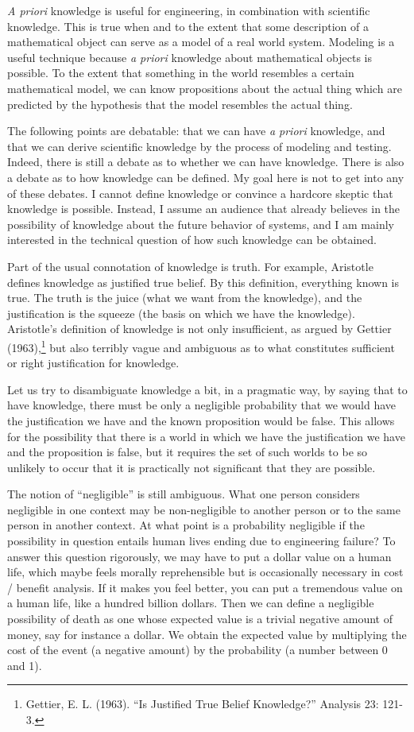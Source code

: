 \documentclass[11pt]{article}
\begin{document}
\emph{A priori}\/ knowledge is useful for engineering, in combination with scientific
knowledge. This is true when and to the extent that some description of a mathematical object
can serve as a model of a real world system. Modeling is a useful technique because
\emph{a priori}\/ knowledge about mathematical objects is possible. To the extent
that something in the world resembles a certain mathematical model, we can know propositions
about the actual thing which are predicted by the hypothesis that the model resembles
the actual thing.

The following points are debatable: that we can have
\emph{a priori}\/ knowledge, and that we can derive scientific knowledge by the process
of modeling and testing. Indeed, there is still a debate as to whether we can have knowledge.
There is also a debate as to how knowledge can be defined. My goal here is not to get
into any of these debates. I cannot define knowledge or convince a hardcore skeptic
that knowledge is possible. Instead, I assume an audience that already believes in the
possibility of knowledge about the future behavior of systems, and I am mainly interested in
the technical question of how such knowledge can be obtained.

Part of the usual connotation of knowledge is truth. For example, Aristotle defines knowledge
as justified true belief. By this definition, everything known is true. The truth is the
juice (what we want from the knowledge), and the justification is the squeeze (the basis
on which we have the knowledge). Aristotle's definition of knowledge is not only
insufficient, as argued by Gettier (1963),\footnote{Gettier, E. L. (1963).
``Is Justified True Belief Knowledge?'' Analysis 23: 121-3.}
but also terribly vague and ambiguous as to what constitutes sufficient or
right justification for knowledge.

Let us try to disambiguate knowledge a bit, in a pragmatic way, by saying that to
have knowledge, there must be only a negligible probability that we would have the
justification we have and the known proposition would be false. This allows for the
possibility that there is a world in which we have the justification we have and the
proposition is false, but it requires the set of such worlds to be so unlikely to occur
that it is practically not significant that they are possible.

The notion of ``negligible'' is still ambiguous. What one person considers negligible
in one context may be non-negligible to another person or to the same person in another
context. At what point is a probability negligible if the possibility in question entails
human lives ending due to engineering failure? To answer this question rigorously, we may have
to put a dollar value on a human life, which maybe feels morally reprehensible but
is occasionally necessary in cost / benefit analysis. If it makes you feel better,
you can put a tremendous value on a human life, like a hundred billion dollars.
Then we can define a negligible possibility of death as one whose expected value
is a trivial negative amount of money,
say for instance a dollar. We obtain the expected value by multiplying the cost of the
event (a negative amount) by the probability (a number between 0 and 1).
\end{document}
